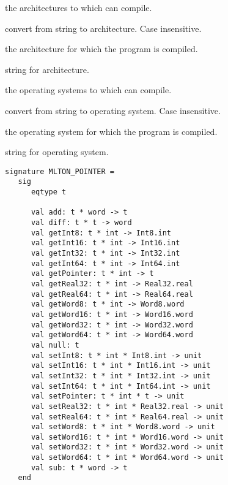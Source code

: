 \begin{description}

the architectures to which {\mlton} can compile.

convert from string to architecture.  Case insensitive.

the architecture for which the program is compiled.

string for architecture.

the operating systems to which {\mlton} can compile.

convert from string to operating system.  Case insensitive.

the operating system for which the program is compiled.

string for operating system.

\end{description}
%

\begin{verbatim}
signature MLTON_POINTER =
   sig
      eqtype t

      val add: t * word -> t
      val diff: t * t -> word
      val getInt8: t * int -> Int8.int
      val getInt16: t * int -> Int16.int
      val getInt32: t * int -> Int32.int
      val getInt64: t * int -> Int64.int
      val getPointer: t * int -> t
      val getReal32: t * int -> Real32.real
      val getReal64: t * int -> Real64.real
      val getWord8: t * int -> Word8.word
      val getWord16: t * int -> Word16.word
      val getWord32: t * int -> Word32.word
      val getWord64: t * int -> Word64.word
      val null: t
      val setInt8: t * int * Int8.int -> unit
      val setInt16: t * int * Int16.int -> unit
      val setInt32: t * int * Int32.int -> unit
      val setInt64: t * int * Int64.int -> unit
      val setPointer: t * int * t -> unit
      val setReal32: t * int * Real32.real -> unit
      val setReal64: t * int * Real64.real -> unit
      val setWord8: t * int * Word8.word -> unit
      val setWord16: t * int * Word16.word -> unit
      val setWord32: t * int * Word32.word -> unit
      val setWord64: t * int * Word64.word -> unit
      val sub: t * word -> t
   end
\end{verbatim}

